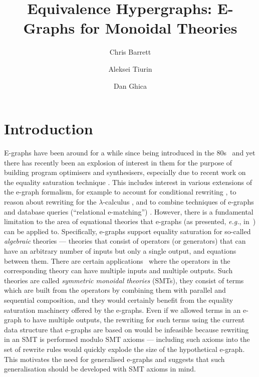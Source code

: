 \documentclass[sigconf, 9pt, nonacm]{acmart}
\theoremstyle{definition}
\begin{document}
\title{Equivalence Hypergraphs: E-Graphs for Monoidal Theories}

\author{Chris Barrett}

\author{Aleksei Tiurin}

\author{Dan Ghica}

\maketitle

\section{Introduction}

E-graphs have been around for a while since being introduced in the 80s~\cite{nelson1980techniques} and yet there has recently been an explosion of interest in them for the purpose of building program optimisers and synthesisers, especially due to recent work on the equality saturation technique \cite{10.1145/1594834.1480915, griggio_proceedings_2022, EggPaper,flatt_small_2022}.
This includes interest in various extensions of the e-graph formalism, for example to account for conditional rewriting \cite{singher2023colored},  to reason about rewriting for the $\lambda$-calculus \cite{koehler2022sketchguided},  and to combine techniques of e-graphs and database queries (``relational e-matching'') \cite{zhang_relational_2022}.
However, there is a fundamental limitation to the area of equational theories that e-graphs (as presented, \textit{e.g.}, in~\cite{EggPaper}) can be applied to.
Specifically, e-graphs support equality saturation for so-called \textit{algebraic} theories --- theories that consist of operators (or generators) that can have an arbitrary number of inputs but only a single output, and equations between them.
There are certain applications~\cite{zx, ghica_compositional_2023, probabilistic} where the operators in the corresponding theory can have multiple inputs and multiple outputs. 
Such theories are called \textit{symmetric monoidal theories} (SMTs), they consist of terms which are built from the operators by combining them with parallel and sequential composition, and they would certainly benefit from the equality saturation machinery offered by the e-graphs.
Even if we allowed terms in an e-graph to have multiple outputs, the rewriting for such terms using the current data structure that e-graphs are based on would be infeasible because rewriting in an SMT is performed modulo SMT axioms --- including such axioms into the set of rewrite rules would quickly explode the size of the hypothetical e-graph.
This motivates the need for generalised e-graphs and suggests that such generalisation should be developed with SMT axioms in mind.
\end{document}
